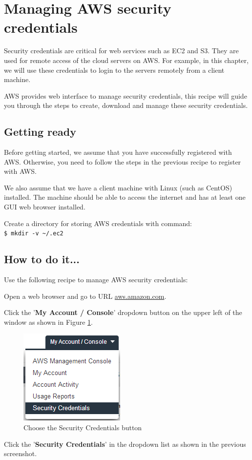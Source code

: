 \section{Managing AWS security credentials}
Security credentials are critical for web services such as EC2 and S3. They are used for remote access of the cloud servers on AWS. For example, in this chapter, we will use these credentials to login to the servers remotely from a client machine.

AWS provides web interface to manage security credentials, this recipe will guide you through the steps to create, download and manage these security credentials.
\subsection*{Getting ready}
Before getting started, we assume that you have successfully registered with AWS. Otherwise, you need to follow the steps in the previous recipe to register with AWS.

We also assume that we have a client machine with Linux (such as CentOS) installed. The machine should be able to access the internet and has at least one GUI web browser installed.

Create a directory for storing AWS credentials with command: \\
\verb|$ mkdir -v ~/.ec2|
\subsection*{How to do it...}
Use the following recipe to manage AWS security credentials:

Open a web browser and go to URL \url{aws.amazon.com}.

Click the '\textbf{My Account / Console}' dropdown button on the upper left of the window as shown in Figure \ref{fig:secu.select}.
\begin{figure}[ht]
  \centering
  \includegraphics[width=.35\textwidth]{figs/5163os_08_07.png}
  \caption{Choose the Security Credentials button}\label{fig:secu.select}
\end{figure} 
Click the '\textbf{Security Credentials}' in the dropdown list as shown in the previous screenshot.

